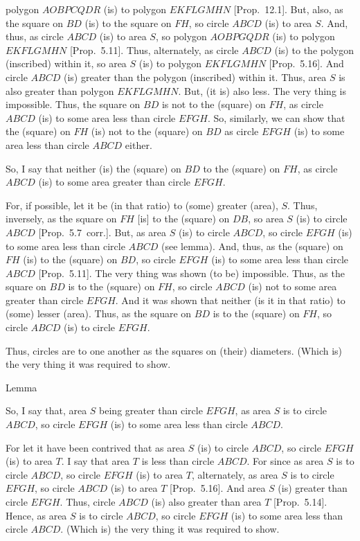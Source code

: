 polygon $AOBPCQDR$ (is) to polygon $EKFLGMHN$ [Prop.~12.1]. But, also, as the square on $BD$ (is) to the square on $FH$, so circle $ABCD$ (is) to area $S$. And, thus, as
circle $ABCD$ (is) to area $S$, so polygon $AOBPGQDR$ (is) to
polygon $EKFLGMHN$ [Prop.~5.11]. Thus, alternately, as circle $ABCD$
(is) to the polygon (inscribed) within it, so area $S$ (is) to polygon $EKFLGMHN$
[Prop.~5.16]. And circle $ABCD$ (is)
greater than the polygon (inscribed) within it. Thus, area $S$ is also greater than polygon 
$EKFLGMHN$. But, (it is) also less. The very thing
is impossible. Thus, the square on $BD$ is not to the (square) on $FH$, as
circle $ABCD$ (is) to some area less than circle $EFGH$. So, similarly,
we can show that the (square) on $FH$ (is) not to the (square) on 
$BD$ as circle $EFGH$ (is) to some area less than circle $ABCD$ either.

So, I say that neither (is) the (square) on $BD$ to the (square) on $FH$,
as circle $ABCD$ (is) to some area greater than circle $EFGH$.

For, if possible, let it be (in that ratio) to (some)  greater (area), $S$. Thus, inversely, 
as the square on $FH$ [is] to the (square) on $DB$, so area $S$ (is) to circle $ABCD$ [Prop.~5.7~corr.]. But, as area $S$ (is) to circle $ABCD$, so circle $EFGH$
(is) to some area less than circle $ABCD$ (see lemma). And, thus, as the (square) on $FH$ (is) to the (square) on $BD$, so circle $EFGH$ (is) to some area
less than  circle $ABCD$ [Prop.~5.11]. The very thing was shown (to be) impossible.
Thus, as the square on $BD$ is to the (square) on $FH$, so circle $ABCD$
(is) not to some area greater than circle $EFGH$. And it was shown that neither (is it in that ratio) to (some) lesser (area). Thus, as the square on $BD$ is to the (square) on $FH$, so circle $ABCD$ (is) to circle $EFGH$.

Thus, circles are to one another as the squares on (their) diameters. (Which is) the very thing it was required to show.


\begin{center}
\large{Lemma}
\end{center}

So, I say that, area $S$ being greater than circle $EFGH$, as area $S$ is to
circle $ABCD$, so circle $EFGH$ (is) to some area less
than circle $ABCD$.

For let it have been contrived that as area $S$ (is) to circle $ABCD$,
so circle $EFGH$ (is) to area $T$. I say that area $T$ is less than circle
$ABCD$. For since as area $S$ is to circle $ABCD$, so circle $EFGH$
(is) to area $T$, alternately, as area $S$ is to circle $EFGH$, so circle
$ABCD$ (is) to area $T$ [Prop.~5.16]. And area $S$ (is) greater than circle $EFGH$.
Thus, circle $ABCD$ (is) also greater than area $T$ [Prop.~5.14]. Hence,
as area $S$ is to circle $ABCD$, so circle $EFGH$ (is) to some area less
than circle $ABCD$. (Which is) the very thing it was required to show.

